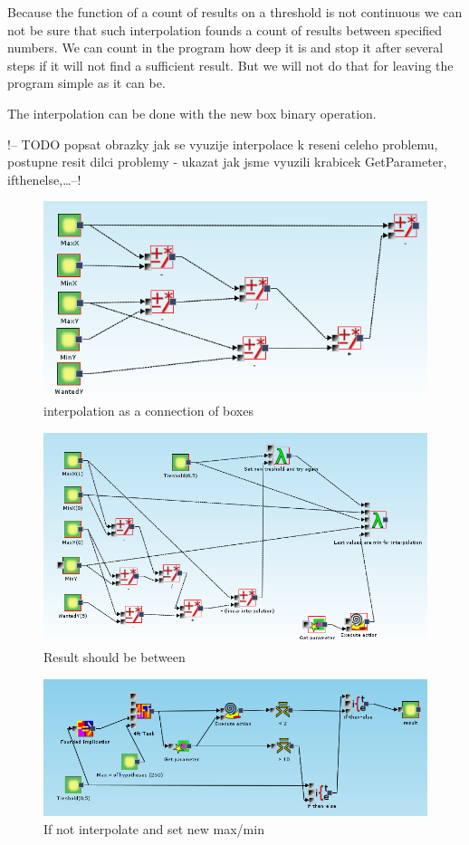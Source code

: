 \documentclass[a4paper,12pt]{book}
\begin{document}
Because the function of a count of results on a threshold is not continuous we can not be sure that such interpolation founds a count of results between specified numbers. We can count in the program how deep it is and stop it after several steps if it will not find a sufficient result. But we will not do that for leaving the program simple as it can be.

The interpolation can be done with the new box binary operation.

!-- TODO popsat obrazky jak se vyuzije interpolace k reseni celeho problemu, postupne resit dilci problemy - ukazat jak jsme vyuzili krabicek GetParameter, ifthenelse,\dots --!
\begin{figure}
	\includegraphics[width=1\textwidth]{linearInterpolation}
	\caption{interpolation as a connection of boxes}
\end{figure}

\begin{figure}
	\includegraphics[width=1\textwidth]{exampleMainRecursionPart}
	\caption{Result should be between}
\end{figure}

\begin{figure}
	\includegraphics[width=1\textwidth]{exampleMainMiningPart}
	\caption{If not interpolate and set new max/min}
\end{figure}
\end{document}
